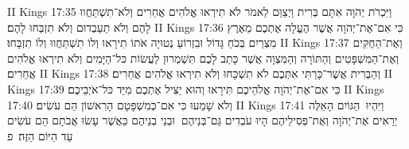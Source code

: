 II Kings 17:35	וַיִּכְרֹת יְהֹוָה אִתָּם בְּרִית וַיְצַוֵּם לֵאמֹר לֹא תִירְאוּ אֱלֹהִים אֲחֵרִים וְלֹא־תִשְׁתַּחֲווּ לָהֶם וְלֹא תַעַבְדוּם וְלֹא תִזְבְּחוּ לָהֶם׃
II Kings 17:36	כִּי אִם־אֶת־יְהֹוָה אֲשֶׁר הֶעֱלָה אֶתְכֶם מֵאֶרֶץ מִצְרַיִם בְּכֹחַ גָּדוֹל וּבִזְרוֹעַ נְטוּיָה אֹתוֹ תִירָאוּ וְלוֹ תִשְׁתַּחֲווּ וְלוֹ תִזְבָּחוּ׃
II Kings 17:37	וְאֶת־הַחֻקִּים וְאֶת־הַמִּשְׁפָּטִים וְהַתּוֹרָה וְהַמִּצְוָה אֲשֶׁר כָּתַב לָכֶם תִּשְׁמְרוּן לַעֲשׂוֹת כּל־הַיָּמִים וְלֹא תִירְאוּ אֱלֹהִים אֲחֵרִים׃
II Kings 17:38	וְהַבְּרִית אֲשֶׁר־כָּרַתִּי אִתְּכֶם לֹא תִשְׁכָּחוּ וְלֹא תִירְאוּ אֱלֹהִים אֲחֵרִים׃
II Kings 17:39	כִּי אִם־אֶת־יְהֹוָה אֱלֹהֵיכֶם תִּירָאוּ וְהוּא יַצִּיל אֶתְכֶם מִיַּד כּל־אֹיְבֵיכֶם׃
II Kings 17:40	וְלֹא שָׁמֵעוּ כִּי אִם־כְּמִשְׁפָּטָם הָרִאשׁוֹן הֵם עֹשִׂים׃
II Kings 17:41	וַיִּהְיוּ  הַגּוֹיִם הָאֵלֶּה יְרֵאִים אֶת־יְהֹוָה וְאֶת־פְּסִילֵיהֶם הָיוּ עֹבְדִים גַּם־בְּנֵיהֶם  וּבְנֵי בְנֵיהֶם כַּאֲשֶׁר עָשׂוּ אֲבֹתָם הֵם עֹשִׂים עַד הַיּוֹם הַזֶּה׃ {פ}
